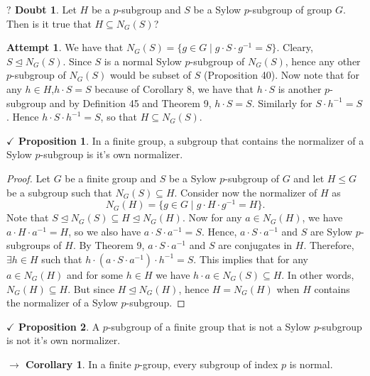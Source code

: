 \documentclass{article}
\theoremstyle{definition}
\theoremstyle{remark}
\theoremstyle{definition}
\newtheorem{corollary}{$ \to $ Corollary}
\theoremstyle{definition}
\newtheorem{proposition}{$\checkmark$ Proposition}
\theoremstyle{definition}
\newtheorem{doubt}{$\boxed{?}$ Doubt}
\theoremstyle{proof}
\newtheorem*{attempt}{Attempt}
\newcommand{\inv}[1]{#1^{-1}}
\newcommand{\nsg}[0]{\trianglelefteq}
\begin{document}
\hrulefill
\begin{doubt}
Let $ H $ be a $ p $-subgroup and $ S $ be a Sylow $ p $-subgroup of group $ G $. Then is it true that $ H\subseteq N_G(S) $?
\end{doubt}
\begin{attempt}
	We have that $ N_G(S) = \{g\in G\;\vert\;g\cdot S\cdot \inv{g} = S\} $. Cleary, $ S\nsg N_G(S) $. Since $ S $ is a normal Sylow $ p $-subgroup of $ N_G(S) $, hence any other $ p $-subgroup of $ N_G(S) $ would be subset of $ S $ (Proposition 40). Now note that for any $ h\in H $,$ h\cdot S = S $ because of Corollary 8, we have that $ h\cdot S $ is another $ p $-subgroup and by Definition 45 and Theorem 9, $ h\cdot S = S$. Similarly for $ S\cdot \inv{h} = S$. Hence $ h\cdot S\cdot \inv{h} = S $, so that $ H\subseteq N_G(S) $.
\end{attempt}
\hrulefill
\begin{proposition}
	In a finite group, a subgroup that contains the normalizer of a Sylow $ p $-subgroup is it's own normalizer.
\end{proposition}
\begin{proof}
	Let $ G $ be a finite group and $ S $ be a Sylow $ p $-subgroup of $ G $ and let $ H \le G$ be a subgroup such that $ N_G(S) \subseteq H $. Consider now the normalizer of $ H $ as 
	\[N_G(H) = \{g\in G\;\vert\; g\cdot H\cdot \inv{g} = H\}.\]
	Note that $ S\nsg N_G(S)\subseteq H \nsg N_G(H) $. Now for any $ a \in N_G(H) $, we have $ a\cdot H\cdot\inv{a} = H $, so we also have $ a\cdot S\cdot \inv{a} = S $. Hence, $ a\cdot S\cdot \inv{a} $ and $ S $ are Sylow $ p $-subgroups of $ H $. By Theorem 9, $ a\cdot S\cdot \inv{a} $ and $ S $ are conjugates in $ H $. Therefore, $ \exists h\in H $ such that $ h\cdot (a\cdot S\cdot \inv{a})\cdot \inv{h} = S $. This implies that for any $ a\in N_G(H) $ and for some $ h\in H $ we have $ h\cdot a \in N_G(S) \subseteq H $. In other words, $ N_G(H) \subseteq H $. But since $ H\nsg N_G(H) $, hence $ H = N_G(H) $ when $ H $ contains the normalizer of a Sylow $ p $-subgroup.
\end{proof}
\hrulefill
\begin{proposition}
	A $ p $-subgroup of a finite group that is not a Sylow $ p $-subgroup is not it's own normalizer.
\end{proposition}
\begin{corollary}
	In a finite $ p $-group, every subgroup of index $ p $ is normal.
\end{corollary}
\end{document}
